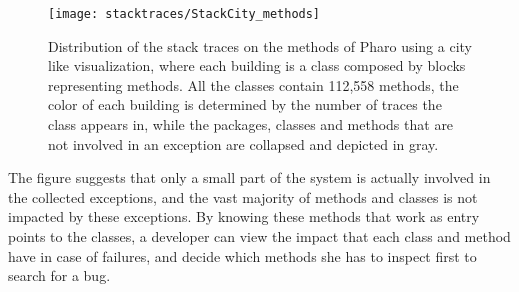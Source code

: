 \begin{figure}[h]
\begin{center}
  \texttt{[image: stacktraces/StackCity\_methods]}
  \caption{Distribution of the stack traces on the methods of Pharo using a city like visualization, where each building is a class composed by blocks representing methods. All the classes contain 112,558 methods, the color of each building is determined by the number of traces the class appears in, while the packages, classes and methods that are not involved in an exception are collapsed and depicted in gray.}
  \label{fig:stackcity-methods}
\end{center}
\end{figure}

The figure suggests that only a small part of the system is actually involved in the collected exceptions, and the vast majority of methods and classes is not impacted by these exceptions. By knowing these methods that work as entry points to the classes, a developer can view the impact that each class and method have in case of failures, and decide which methods she has to inspect first to search for a bug.

